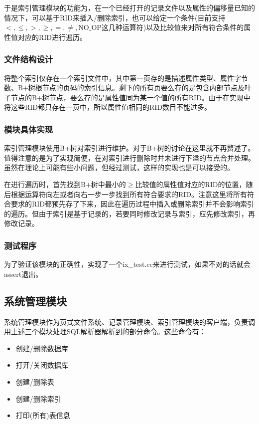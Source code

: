 \documentclass[11pt,UTF8]{report}
\begin{document}
于是索引管理模块的功能为，在一个已经打开的记录文件以及属性的偏移量已知的情况下，可以基于RID来插入/删除索引，也可以给定一个条件(目前支持$<,\leq,>,\geq,=,\not=,\text{NO\_OP}$这几种运算符)以及比较值来对所有符合条件的属性值对应的RID进行遍历。
\subsubsection{文件结构设计}

将整个索引仅存在一个索引文件中，其中第一页存的是描述属性类型、属性字节数、B+树根节点的页码的索引信息。剩下的所有页要么存的是包含内部节点及叶子节点的B+树节点，要么存的是属性值同为某一个值的所有RID。由于在实现中将这些RID都只存在一页中，所以属性值相同的RID数目不能过多。
\subsubsection{模块具体实现}

索引管理模块使用B+树对索引进行维护。对于B+树的讨论在这里就不再赘述了。值得注意的是为了实现简便，在对索引进行删除时并未进行下溢的节点合并处理。虽然在理论上可能有些小问题，但经过测试，这样的实现也是可以接受的。

在进行遍历时，首先找到B+树中最小的$\geq$比较值的属性值对应的RID的位置，随后根据运算符向左或者向右一步一步找到所有符合要求的RID。注意这里将所有符合要求的RID都预先存了下来，因此在遍历过程中插入或删除索引并不会影响索引的遍历。但由于索引是基于记录的，若要同时修改记录与索引，应先修改索引，再修改记录。

\subsubsection{测试程序}

为了验证该模块的正确性，实现了一个ix\_test.cc来进行测试，如果不对的话就会assert退出。
\subsection{系统管理模块}

系统管理模块作为页式文件系统、记录管理模块、索引管理模块的客户端，负责调用上述三个模块处理SQL解析器解析到的部分命令。这些命令有：

\begin{itemize}
	\item 创建/删除数据库
	\item 打开/关闭数据库
	\item 创建/删除表
	\item 创建/删除索引
	\item 打印(所有)表信息
\end{itemize}
\end{document}
